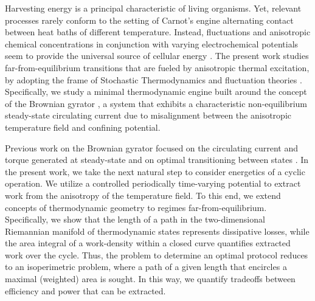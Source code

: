 \documentclass[
 reprint,
superscriptaddress,
 amsmath,amssymb,prl
 aps
]{revtex4-2}
\begin{document}
\maketitle

Harvesting energy is a principal characteristic of living organisms. Yet, relevant processes rarely conform to the setting of Carnot’s engine alternating contact between heat baths of different temperature. Instead, fluctuations and anisotropic chemical concentrations in conjunction with varying electrochemical potentials seem to provide the universal source of cellular energy \cite{battle2016broken,gnesotto2018broken}. The present work studies far-from-equilibrium transitions that are fueled by anisotropic thermal excitation, by adopting the frame of Stochastic Thermodynamics 
{{\cite{sekimoto2010stochastic,seifert2012stochastic,chen2019stochastic,Jarz2011ineq}}} and fluctuation theories \cite{Jarz1996eq,Cohen1995FT,Evans1994FT,Crooks1999FT,Hatano2001FT}.
Specifically, we study a minimal thermodynamic engine built around the concept of the Brownian gyrator \cite{BGyrator2007first}, a system that exhibits a characteristic non-equilibrium steady-state circulating current due to misalignment between the anisotropic temperature field and confining potential.

Previous work on the Brownian gyrator focused on the circulating current and torque generated at steady-state \cite{BGyrator2007first,BGyrator2013CilibertoExperim,BGyrator2013dotsenko,BGyrator2017electrical,BGyrator2017experimental,Imparato2017BG} and on optimal transitioning between states  \cite{baldassarri2020engineered}. In the present work, we take the next natural step to consider energetics of a cyclic operation. We utilize a controlled periodically time-varying potential to extract work from the anisotropy of the temperature field. To this end, we extend concepts of thermodynamic geometry \cite{Ruppeiner1995geom,Crooks2007length,Bradner2020geom} to regimes far-from-equilibrium. Specifically, we show that the length of a path in the two-dimensional Riemannian manifold of thermodynamic states represents dissipative losses, while the area integral of a work-density within a closed curve quantifies extracted work over the cycle. Thus, the problem to determine an optimal protocol reduces to an isoperimetric problem, where a path of a given length that encircles a maximal (weighted) area is sought. In this way, we quantify tradeoffs between efficiency and power that can be extracted.
\end{document}
